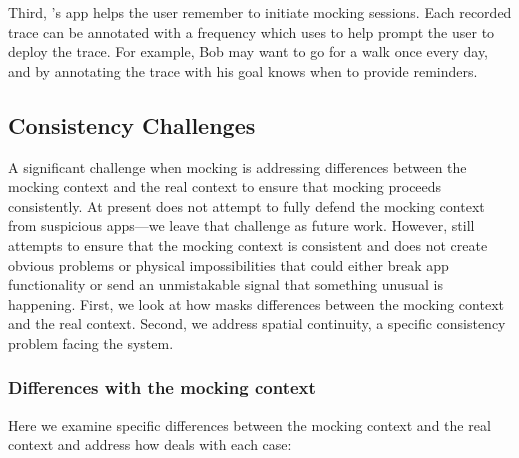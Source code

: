 Third, \PocketMocker{}'s app helps the user remember to initiate mocking
sessions. Each recorded trace can be annotated with a frequency which
\PocketMocker{} uses to help prompt the user to deploy the trace. For
example, Bob may want to go for a walk once every day, and by annotating the
trace with his goal \PocketMocker{} knows when to provide reminders.

\subsection{Consistency Challenges}

A significant challenge when mocking is addressing differences between the
mocking context and the real context to ensure that mocking proceeds
consistently. At present \PocketMocker{} does not attempt to fully defend the
mocking context from suspicious apps---we leave that challenge as future
work. However, \PocketMocker{} still attempts to ensure that the mocking
context is consistent and does not create obvious problems or physical
impossibilities that could either break app functionality or send an
unmistakable signal that something unusual is happening. First, we look at
how \PocketMocker{} masks differences between the mocking context and the
real context. Second, we address spatial continuity, a specific consistency
problem facing the \PocketMocker{} system.

\subsubsection{Differences with the mocking context}

Here we examine specific differences between the mocking context and the real
context and address how \PocketMocker{} deals with each case:


